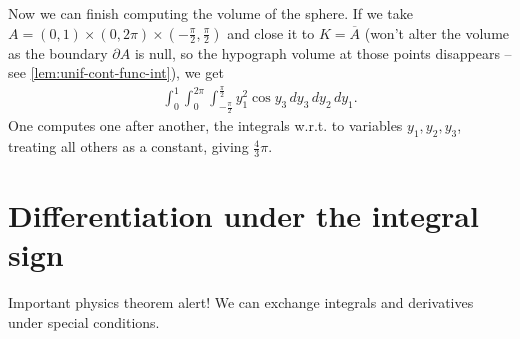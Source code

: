 \begin{eg}
	Now we can finish computing the volume of the sphere. If we take $A = (0,1) \times (0, 2\pi) \times (-\tfrac{\pi}{2}, \tfrac{\pi}{2})$ and close it to $K = \overline{ A } $ (won't alter the volume as the boundary $\partial A$ is null, so the hypograph volume at those points disappears -- see \ref{lem:unif-cont-func-int}), we get
	\begin{align*}
		\int_{0}^{1} \int_{0}^{2\pi} \int_{-\tfrac{\pi}{2}}^{\tfrac{\pi}{2}} y_{1}^{2} \cos y_{3} \, d y_{3}  \, d y_{2} \, d y_{1}.
	\end{align*}
	One computes one after another, the integrals w.r.t. to variables $y_{1}, y_{2}, y_{3}$, treating all others as a constant, giving $\frac{4}{3}\pi$.
\end{eg}

\section{Differentiation under the integral sign}

Important physics theorem alert! We can exchange integrals and derivatives under special conditions.


